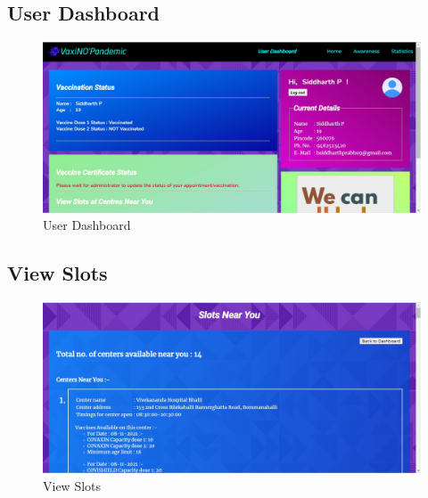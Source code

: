 \documentclass{article}
\begin{document}
    \subsection{User Dashboard}
        \begin{figure}[hbt]
            \centering
            \includegraphics[scale=0.406]{userdash.jpg}
            \caption{User Dashboard}
            \label{fig:userdashboard}
        \end{figure}
    \subsection{View Slots}
        \begin{figure}[hbt]
            \centering
            \includegraphics[scale=0.406]{slots.jpg}
            \caption{View Slots}
            \label{fig:slots}
        \end{figure}
    \newpage
\end{document}
